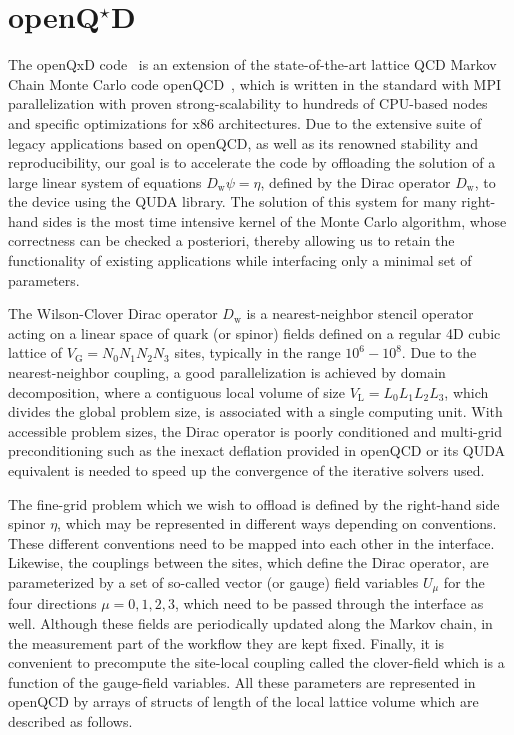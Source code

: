 \chapter{\texorpdfstring{openQ$^\star$D}{openQxD}}
\label{ch:p1:openqxd}

\newcommand{\Dw}{{D_{\mathrm{w}}}}

The openQxD code~\cite{openqxd} is an extension of the state-of-the-art
lattice QCD Markov Chain Monte Carlo code
openQCD~\cite{openqcd,Luscher:2012av}, which is written in the  standard
with MPI parallelization with proven strong-scalability to hundreds of
CPU-based nodes and specific optimizations for x86 architectures.
Due to the extensive suite of legacy applications based on openQCD, as well as
its renowned stability and reproducibility, our goal is to accelerate the code
by offloading the solution of a large linear system of equations
$\Dw\psi=\eta$, defined by the Dirac operator $\Dw$, to the
device using the QUDA library.
The solution of this system for many right-hand sides is the most time
intensive kernel of the Monte Carlo algorithm, whose correctness can be
checked a posteriori, thereby allowing us to retain the functionality of
existing applications while interfacing only a minimal set of parameters.

The Wilson-Clover Dirac operator $\Dw$ is a nearest-neighbor stencil operator
acting on a linear space of quark (or spinor) fields defined on a regular 4D
cubic lattice of $V_\mathrm{G}=N_0N_1N_2N_3$ sites, typically in the range $10^6-10^8$.
Due to the nearest-neighbor coupling, a good parallelization is achieved by
domain decomposition, where a contiguous local volume of size $V_\mathrm{L}=L_0L_1L_2L_3$,
which divides the global problem size, is associated with a single computing
unit.
With accessible problem sizes, the Dirac operator is poorly conditioned and
multi-grid preconditioning such as the inexact deflation \cite{Lüscher2007deflation} provided in openQCD
or its QUDA equivalent is needed to speed up the convergence of the iterative
solvers used.

The fine-grid problem which we wish to offload is defined by the right-hand
side spinor $\eta$, which may be represented in different ways depending on 
conventions. These different conventions need to be mapped into each other in the interface.
Likewise, the couplings between the sites, which define the Dirac operator, are
parameterized by a set of so-called vector (or gauge) field variables $U_\mu$
for the four directions $\mu=0,1,2,3$, which need to be passed through the interface as well.
Although these fields are periodically updated along the Markov chain, in
the measurement part of the workflow they are kept fixed.
Finally, it is convenient to precompute the site-local coupling called the
clover-field which is a function of the gauge-field variables.
All these parameters are represented in openQCD by arrays of structs of length of
the local lattice volume which are described as follows.

